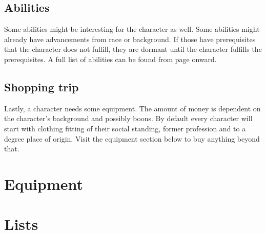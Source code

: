 \documentclass[12pt,a4paper,openany]{book}
\begin{document}
	\section{Abilities}
	Some abilities might be interesting for the character as well. Some abilities might already have advancements from race or background. If those have prerequisites that the character does not fulfill, they are dormant until the character fulfills the prerequisites. A full list of abilities can be found from page \pageref{abilitylist} onward.
	\section{Shopping trip}
	Lastly, a character needs some equipment. The amount of money is dependent on the character’s background and possibly boons. By default every character will start with clothing fitting of their social standing, former profession and to a degree place of origin. Visit the equipment section below to buy anything beyond that. 
	
	\chapter{Equipment}
		
		
	
	
	
		

	
	
	
	\chapter{Lists}
	
	
		

	
		
	
	
	
	
	
	
\end{document}
